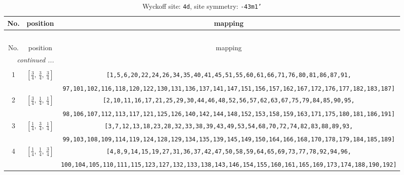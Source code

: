 \documentclass[fleqn,8pt]{jsarticle}
\begin{document}
\begin{longtable}{ccc}
\caption{Wyckoff site: {\tt 4d}, site symmetry: {\tt -43m1'}}
 \\
 \hline \hline
No. & position & mapping \\ \hline \endfirsthead

\multicolumn{2}{l}{\tablename\ \thetable{}} \\
 \hline \hline
No. & position & mapping \\ \hline \endhead

 \hline \hline
\multicolumn{2}{r}{\footnotesize\it continued ...} \\ \endfoot

 \hline \hline
\multicolumn{2}{r}{} \\ \endlastfoot

1 & $\left[ \frac{3}{4},\, \frac{3}{4},\, \frac{3}{4} \right]$ & {\tt [1,5,6,20,22,24,26,34,35,40,41,45,51,55,60,61,66,71,76,80,81,86,87,91,} \\ \hline
 &  & {\tt 97,101,102,116,118,120,122,130,131,136,137,141,147,151,156,157,162,167,172,176,177,182,183,187]} \\ \hline
2 & $\left[ \frac{3}{4},\, \frac{1}{4},\, \frac{1}{4} \right]$ & {\tt [2,10,11,16,17,21,25,29,30,44,46,48,52,56,57,62,63,67,75,79,84,85,90,95,} \\ \hline
 &  & {\tt 98,106,107,112,113,117,121,125,126,140,142,144,148,152,153,158,159,163,171,175,180,181,186,191]} \\ \hline
3 & $\left[ \frac{1}{4},\, \frac{3}{4},\, \frac{1}{4} \right]$ & {\tt [3,7,12,13,18,23,28,32,33,38,39,43,49,53,54,68,70,72,74,82,83,88,89,93,} \\ \hline
 &  & {\tt 99,103,108,109,114,119,124,128,129,134,135,139,145,149,150,164,166,168,170,178,179,184,185,189]} \\ \hline
4 & $\left[ \frac{1}{4},\, \frac{1}{4},\, \frac{3}{4} \right]$ & {\tt [4,8,9,14,15,19,27,31,36,37,42,47,50,58,59,64,65,69,73,77,78,92,94,96,} \\ \hline
 &  & {\tt 100,104,105,110,111,115,123,127,132,133,138,143,146,154,155,160,161,165,169,173,174,188,190,192]} \\
\end{longtable}
\renewcommand{\arraystretch}{1.2}
\end{document}
